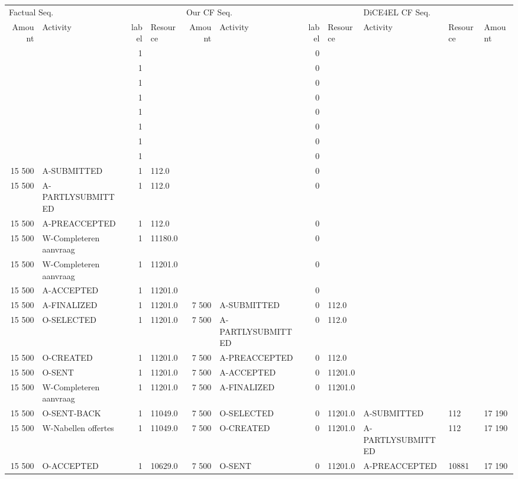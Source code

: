 \begin{tabular}{rlrlrlrllll}
\toprule
\multicolumn{4}{l}{Factual Seq.} & \multicolumn{4}{l}{Our CF Seq.} & \multicolumn{3}{l}{DiCE4EL CF Seq.} \\
Amount & Activity & label & Resource & Amount & Activity & label & Resource & Activity & Resource & Amount \\
\midrule
 &  & 1 &  &  &  & 0 &  &  &  &  \\
 &  & 1 &  &  &  & 0 &  &  &  &  \\
 &  & 1 &  &  &  & 0 &  &  &  &  \\
 &  & 1 &  &  &  & 0 &  &  &  &  \\
 &  & 1 &  &  &  & 0 &  &  &  &  \\
 &  & 1 &  &  &  & 0 &  &  &  &  \\
 &  & 1 &  &  &  & 0 &  &  &  &  \\
 &  & 1 &  &  &  & 0 &  &  &  &  \\
15 500 & A-SUBMITTED & 1 & 112.0 &  &  & 0 &  &  &  &  \\
15 500 & A-PARTLYSUBMITTED & 1 & 112.0 &  &  & 0 &  &  &  &  \\
15 500 & A-PREACCEPTED & 1 & 112.0 &  &  & 0 &  &  &  &  \\
15 500 & W-Completeren aanvraag & 1 & 11180.0 &  &  & 0 &  &  &  &  \\
15 500 & W-Completeren aanvraag & 1 & 11201.0 &  &  & 0 &  &  &  &  \\
15 500 & A-ACCEPTED & 1 & 11201.0 &  &  & 0 &  &  &  &  \\
15 500 & A-FINALIZED & 1 & 11201.0 & 7 500 & A-SUBMITTED & 0 & 112.0 &  &  &  \\
15 500 & O-SELECTED & 1 & 11201.0 & 7 500 & A-PARTLYSUBMITTED & 0 & 112.0 &  &  &  \\
15 500 & O-CREATED & 1 & 11201.0 & 7 500 & A-PREACCEPTED & 0 & 112.0 &  &  &  \\
15 500 & O-SENT & 1 & 11201.0 & 7 500 & A-ACCEPTED & 0 & 11201.0 &  &  &  \\
15 500 & W-Completeren aanvraag & 1 & 11201.0 & 7 500 & A-FINALIZED & 0 & 11201.0 &  &  &  \\
15 500 & O-SENT-BACK & 1 & 11049.0 & 7 500 & O-SELECTED & 0 & 11201.0 & A-SUBMITTED & 112 & 17 190 \\
15 500 & W-Nabellen offertes & 1 & 11049.0 & 7 500 & O-CREATED & 0 & 11201.0 & A-PARTLYSUBMITTED & 112 & 17 190 \\
15 500 & O-ACCEPTED & 1 & 10629.0 & 7 500 & O-SENT & 0 & 11201.0 & A-PREACCEPTED & 10881 & 17 190 \\

\end{tabular}
